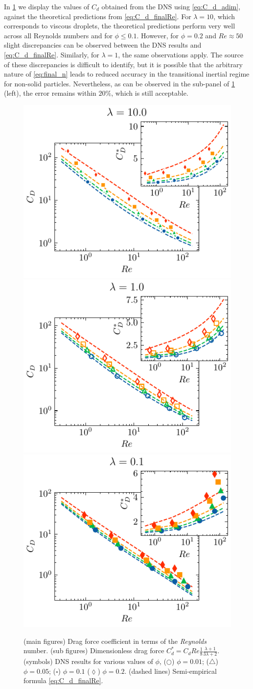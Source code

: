 In \ref{fig:cp} we display the values of $C_d$ obtained from the DNS using \ref{eq:C_d_adim}, against the theoretical predictions from \ref{eq:C_d_finalRe}. 
For $\lambda = 10$, which corresponds to viscous droplets, the theoretical predictions perform very well across all Reynolds numbers and for $\phi \le 0.1$. 
However, for $\phi = 0.2$ and $Re \approx 50$ slight discrepancies can be observed between the DNS results and \eqref{eq:C_d_finalRe}. 
Similarly, for $\lambda = 1$, the same observations apply. 
The source of these discrepancies is difficult to identify, but it is possible that the arbitrary nature of \ref{eq:final_n} leads to reduced accuracy in the transitional inertial regime for non-solid particles.
Nevertheless, as can be observed in the sub-panel of \ref{fig:cp} (left), the error remains within $20\%$, which is still acceptable.  
\begin{figure}[h!]
    \centering
    \includegraphics[height = 0.3\textwidth]{image/HOMOGENEOUS_final/CA/Cp_l_10.pdf}
    \includegraphics[height = 0.3\textwidth]{image/HOMOGENEOUS_final/CA/Cp_l_1.pdf}
    \includegraphics[height = 0.3\textwidth]{image/HOMOGENEOUS_final/CA/Cp_l_0.pdf}
    \caption{
        (main figures)
        Drag force coefficient in terms of the \textit{Reynolds} number. 
        (sub figures) Dimensionless drag force $C_d^* =C_d Re \frac{1}{8}\frac{\lambda+1}{3\lambda +2}$. 
        (symbols) DNS results for various values of $\phi$, 
        ($\pmb\bigcirc$) $\phi = 0.01$; ($\pmb\triangle$) $ \phi = 0.05$; ($\pmb\square$) $\phi = 0.1$ ($\pmb\lozenge$) $\phi = 0.2$.
        (dashed lines) Semi-empirical formula \ref{eq:C_d_finalRe}. 
        }
    \label{fig:cp}
\end{figure}

